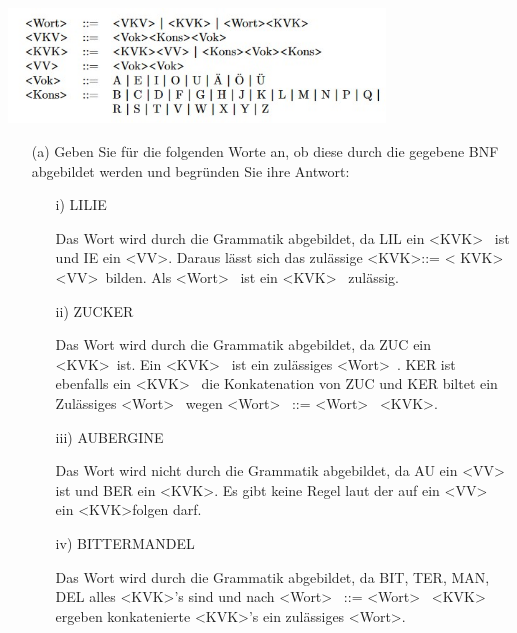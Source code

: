 \begin{center}
  \includegraphics[width=10cm]{gramm.jpg}
\end{center}  
\begin{itemize}
  \item [(a)] Geben Sie für die folgenden Worte an, ob diese durch die gegebene BNF abgebildet werden und begründen Sie ihre Antwort:
  
\begin{itemize}
  \item [i)] LILIE

  Das Wort wird durch die Grammatik abgebildet, da LIL ein 
  \textless KVK\textgreater~ ist und IE ein \textless VV\textgreater. Daraus 
  lässt sich das zulässige \textless KVK\textgreater ::= \textless 
  KVK\textgreater \textless VV\textgreater ~bilden. Als \textless Wort\textgreater~  ist 
  ein \textless KVK\textgreater~ zulässig.

  \item [ii)] ZUCKER
  
  Das Wort wird durch die Grammatik abgebildet, da ZUC ein 
  \textless KVK\textgreater ~ist. Ein \textless KVK\textgreater~ ist ein 
  zulässiges \textless Wort\textgreater~. KER ist ebenfalls ein
  \textless KVK\textgreater~ die Konkatenation von ZUC und KER biltet ein 
  Zulässiges \textless Wort\textgreater~ wegen 
  \textless Wort\textgreater~ ::= \textless Wort\textgreater~ \textless KVK\textgreater.

  \item [iii)] AUBERGINE
  
  Das Wort wird nicht durch die Grammatik abgebildet, da AU ein 
  \textless VV\textgreater~ ist und BER ein \textless KVK\textgreater. 
  Es gibt keine Regel laut der auf ein \textless VV\textgreater~ ein \textless KVK\textgreater folgen darf.

  \item [ iv)] BITTERMANDEL
  
  Das Wort wird durch die Grammatik abgebildet, da BIT, TER, MAN, DEL alles 
  \textless KVK\textgreater's sind und nach
  \textless Wort\textgreater~ ::= \textless Wort\textgreater~ \textless KVK\textgreater
  ergeben konkatenierte \textless KVK\textgreater's ein zulässiges \textless Wort\textgreater.


\end{itemize}
\end{itemize}

